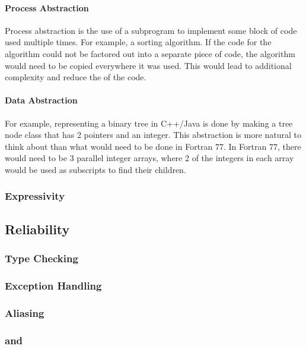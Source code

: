 \paragraph{Process Abstraction}\label{par:Process_Abstraction}
Process abstraction is the use of a subprogram to implement some block of code used multiple times.
For example, a sorting algorithm.
If the code for the algorithm could not be factored out into a separate piece of code, the algorithm would need to be copied everywhere it was used.
This would lead to additional complexity and reduce the  of the code.

\paragraph{Data Abstraction}\label{par:Data_Abstraction}
For example, representing a binary tree in C++/Java is done by making a tree node class that has 2 pointers and an integer.
This abstraction is more natural to think about than what would need to be done in Fortran 77.
In Fortran 77, there would need to be 3 parallel integer arrays, where 2 of the integers in each array would be used as subscripts to find their children.

\subsubsection{Expressivity}\label{subsubsec:Expressivity}

\subsection{Reliability}\label{subsec:Reliability}
\subsubsection{Type Checking}\label{subsubsec:Type_Checking}
\subsubsection{Exception Handling}\label{subsubsec:Exception_Handling}
\subsubsection{Aliasing}\label{subsubsec:Aliasing}
\subsubsection{ and }\label{subsubsec:Reliable_Readability_and_Writability}

